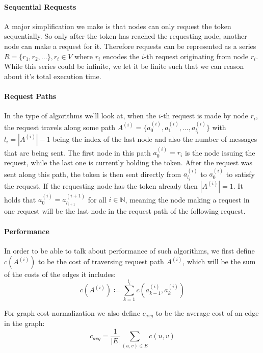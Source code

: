\documentclass[a4paper, oneside]{discothesis}
\begin{document}
\paragraph{Sequential Requests} A major simplification we make is that nodes can only request the token sequentially. So only after the token has reached the requesting node, another node can make a request for it. Therefore requests can be represented as a series $R=\{r_1,r_2,\dots\},r_i\in V$ where $r_i$ encodes the $i$-th request originating from node $r_i$. While this series could be infinite, we let it be finite such that we can reason about it's total execution time.

\paragraph{Request Paths} In the type of algorithms we'll look at, when the $i$-th request is made by node $r_i$, the request travels along some path $A^{(i)}=\{a^{(i)}_0,a^{(i)}_1,\dots,a^{(i)}_{l_i}\}$ with $l_i=|A^{(i)}|-1$ being the index of the last node and also the number of messages that are being sent. The first node in this path $a^{(i)}_0=r_i$ is the node issuing the request, while the last one is currently holding the token. After the request was sent along this path, the token is then sent directly from $a^{(i)}_{l_i}$ to $a^{(i)}_0$ to satisfy the request. If the requesting node has the token already then $|A^{(i)}|=1$. It holds that $a^{(i)}_0=a^{(i+1)}_{l_{i+1}}$ for all $i\in\mathbb{N}$, meaning the node making a request in one request will be the last node in the request path of the following request.

\paragraph{Performance}\label{model-perf} In order to be able to talk about performance of such algorithms, we first define $c(A^{(i)})$ to be the cost of traversing request path $A^{(i)}$, which will be the sum of the costs of the edges it includes:
\begin{equation}
c(A^{(i)})\coloneqq\sum_{k=1}^{l_i}c(a^{(i)}_{k-1}, a^{(i)}_k)
\end{equation}

For graph cost normalization we also define $c_{avg}$ to be the average cost of an edge in the graph:
\begin{equation}
c_{avg}=\frac{1}{|E|}\sum_{(u,v)\in E}c(u,v)
\end{equation}
\end{document}
